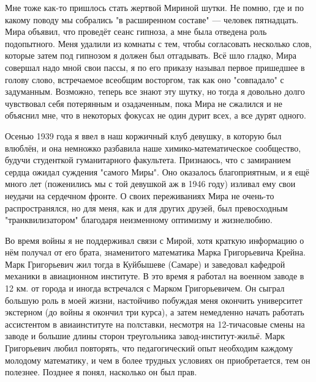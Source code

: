 Мне тоже как-то пришлось стать жертвой Мириной шутки.
Не помню, где и по какому поводу мы собрались "в расширенном составе" --- человек пятнадцать.
Мира объявил, что проведёт сеанс гипноза, а мне была отведена роль подопытного.
Меня удалили из комнаты с тем, чтобы согласовать несколько слов, которые затем под гипнозом я должен был отгадывать.
Всё шло гладко, Мира совершал надо мной свои пассы, я по его приказу называл первое пришедшее в голову слово,
встречаемое всеобщим восторгом, так как оно "совпадало" с задуманным.
Возможно, теперь все знают эту шутку, но тогда я довольно долго чувствовал себя потерянным и озадаченным,
пока Мира не сжалился и не объяснил мне, что в некоторых фокусах не один дурит всех, а все дурят одного.

Осенью 1939 года я ввел в наш коржичный клуб девушку, в которую был влюблён, и она немножко разбавила наше химико-математическое сообщество, будучи студенткой гуманитарного факультета. Признаюсь, что с замиранием сердца ожидал суждения "самого Миры". Оно оказалось благоприятным, и я ещё много лет (поженились мы с той девушкой аж в 1946 году) изливал ему свои неудачи на сердечном фронте. О своих переживаниях Мира не очень-то распространялся, но для меня, как и для других друзей, был превосходным "транквилизатором" благодаря неизменному оптимизму и жизнелюбию.

Во время войны я не поддерживал связи с Мирой, хотя краткую информацию о нём получал от его брата, знаменитого математика Марка Григорьевича Крейна. Марк Григорьевич жил тогда в Куйбышеве (Самаре) и заведовал кафедрой механики в авиационном институте. В это время я работал на военном заводе в 12 км. от города и иногда встречался с Марком Григорьевичем. Он сыграл большую роль в моей жизни, настойчиво побуждая меня окончить университет экстерном (до войны я окончил три курса), а затем немедленно начать работать ассистентом в авиаинституте на полставки, несмотря на 12-тичасовые смены на заводе и большие длины сторон треугольника завод-институт-жильё. Марк Григорьевич любил повторять, что педагогический опыт необходим каждому молодому математику, и чем в более трудных условиях он приобретается, тем он полезнее. Позднее я понял, насколько он был прав.

